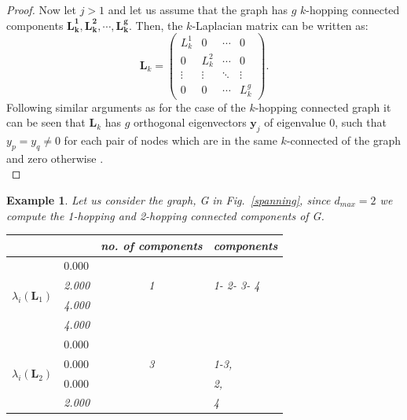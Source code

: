 \documentclass[10pt,a4paper]{article}
\newtheorem{exa}{Example}
\begin{document}
\begin{proof}
    	    	Now let $j>1$ and let us assume that the graph has $g$ $k$-hopping connected components $\mathbf{L_{k}^1,L_{k}^2,\cdots, L_{k}^g }$. Then, the $k$-Laplacian matrix can be written as:
    	    	\begin{equation*}
    	    	\mathbf{L}_k = \begin{pmatrix}
    	    	L_{k}^1 & 0 & \cdots & 0 \\
    	    	0 & L_{k}^2 & \cdots & 0\\
    	    	\vdots& \vdots & \ddots & \vdots \\
    	    	0 & 0 & \cdots & L_{k}^g
    	    	\end{pmatrix}.
    	    	\end{equation*}
    	    	Following similar arguments as for the case of the $k$-hopping connected graph it can be seen that $\mathbf{L}_k$ has $g$ orthogonal eigenvectors $\mathbf{y}_j$ of eigenvalue $0$, such that $y_p = y_q \neq 0$ for each pair of nodes which are in the same $k$-connected of the graph and zero otherwise \citep{estrada2012path}.\\  	
    	    \end{proof}
    	    
    	    \begin{exa}
    	    	Let us consider the graph, G in Fig.~\ref{spanning}, since $d_{max} = 2$ we compute the 1-hopping and 2-hopping connected components of G.
    	    	
    	    	\begin{table}[H]
    	    		\centering
    	    		\begin{tabular}{ |l|l|c|l| }
    	    			\hline
    	    			& & no. of components & components \\
    	    			\hline
    	    			\multirow{4}{*}{$\lambda_i(\mathbf{L}_1)$} & $\mathbf{0.000}$& & \\
    	    			& 2.000& 1& 1- 2- 3- 4\\
    	    			& 4.000 & & \\
    	    			& 4.000 & & \\ \hline
    	    			\multirow{4}{*}{$\lambda_i(\mathbf{L}_2)$} & $\mathbf{0.000}$& & \\
    	    			& $\mathbf{0.000}$& 3 & 1-3,\\
    	    			& $\mathbf{0.000}$ &  & 2,\\
    	    			& 2.000 &  & 4\\
    	    			\hline
    	    		\end{tabular}   
    	    	\end{table}
    	    	
    	    	
    	    \end{exa}
\end{document}
